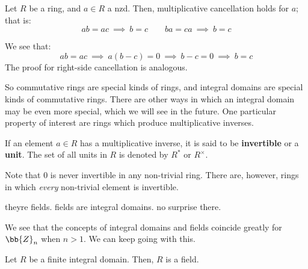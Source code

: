 \documentclass{article}
\begin{document}
\newpage
\begin{thm}
    Let $ R $ be a ring, and $ a \in R $ a nzd.
    Then, multiplicative cancellation holds for $ a $; that is:
    \begin{equation*}
        ab = ac \ \implies \ b = c \qquad ba = ca \ \implies \ b = c
    \end{equation*}
\end{thm}

\vspace{-0.1in}
\begin{pf}[source=Primary Source Material]
    We see that:
    \begin{equation*}
        ab = ac \ \implies \ a(b-c) = 0 \ \implies \ b-c = 0 \ \implies \ b = c
    \end{equation*}
    The proof for right-side cancellation is analogous.
\end{pf}

So commutative rings are special kinds of rings, and integral domains are special kinds of
commutative rings. There are other ways in which an integral domain may be even more special,
which we will see in the future. One particular property of interest are rings which produce
multiplicative inverses.

\begin{defn}
    If an element $ a \in R $ has a multiplicative inverse, it is said to be \textbf{invertible} or
    a \textbf{unit}. \vsp
    The set of all units in $ R $ is denoted by $ R^{*} $ or $ R^{\times} $.
\end{defn}

Note that $ 0 $ is never invertible in any non-trivial ring.
There are, however, rings in which \textit{every} non-trivial element is invertible.

theyre fields. fields are integral domains. no surprise there.

We see that the concepts of integral domains and fields coincide greatly for $ \bb{Z}_{n} $ when
$ n > 1 $. We can keep going with this.

\begin{thm}
    Let $ R $ be a finite integral domain. Then, $ R $ is a field.
\end{thm}
\end{document}
